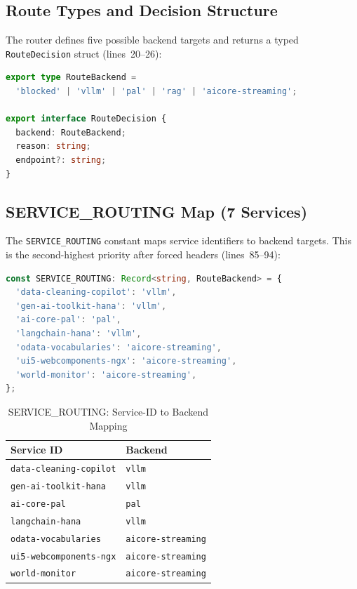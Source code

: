 \documentclass[11pt]{article}
\begin{document}
\subsection{Route Types and Decision Structure}

The router defines five possible backend targets and returns a typed
\texttt{RouteDecision} struct (lines~20--26):

\begin{lstlisting}[language=TypeScript,caption={RouteBackend and RouteDecision (intent-router.ts, lines 20--26)},firstnumber=20]
export type RouteBackend =
  'blocked' | 'vllm' | 'pal' | 'rag' | 'aicore-streaming';

export interface RouteDecision {
  backend: RouteBackend;
  reason: string;
  endpoint?: string;
}
\end{lstlisting}

\subsection{SERVICE\_ROUTING Map (7 Services)}

The \texttt{SERVICE\_ROUTING} constant maps service identifiers to backend
targets. This is the second-highest priority after forced headers
(lines~85--94):

\begin{lstlisting}[language=TypeScript,caption={SERVICE\_ROUTING map (intent-router.ts, lines 85--94)},firstnumber=85]
const SERVICE_ROUTING: Record<string, RouteBackend> = {
  'data-cleaning-copilot': 'vllm',
  'gen-ai-toolkit-hana': 'vllm',
  'ai-core-pal': 'pal',
  'langchain-hana': 'vllm',
  'odata-vocabularies': 'aicore-streaming',
  'ui5-webcomponents-ngx': 'aicore-streaming',
  'world-monitor': 'aicore-streaming',
};
\end{lstlisting}

\begin{table}[h]
\centering
\caption{SERVICE\_ROUTING: Service-ID to Backend Mapping}
\begin{tabular}{@{}ll@{}}
\toprule
\textbf{Service ID} & \textbf{Backend} \\
\midrule
\texttt{data-cleaning-copilot} & \texttt{vllm} \\
\texttt{gen-ai-toolkit-hana} & \texttt{vllm} \\
\texttt{ai-core-pal} & \texttt{pal} \\
\texttt{langchain-hana} & \texttt{vllm} \\
\texttt{odata-vocabularies} & \texttt{aicore-streaming} \\
\texttt{ui5-webcomponents-ngx} & \texttt{aicore-streaming} \\
\texttt{world-monitor} & \texttt{aicore-streaming} \\
\bottomrule
\end{tabular}
\end{table}
\end{document}
